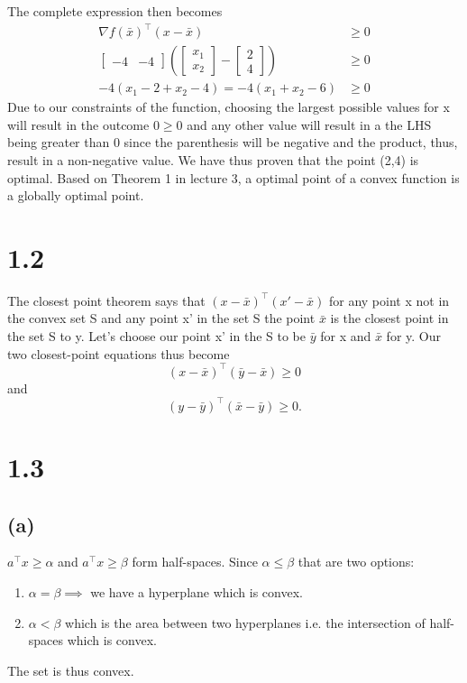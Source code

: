 \documentclass{article}
\begin{document}
	The complete expression then becomes 
	\begin{align}
		\nabla f(\bar{x})^\top (x -\bar{x}) &\geq 0 \\
			\begin{bmatrix}
			-4 &
			-4
		\end{bmatrix}
		\left(\begin{bmatrix}
			x_1 \\ x_2
		\end{bmatrix} -
		\begin{bmatrix}
			2 \\ 4
		\end{bmatrix}\right)
		& \geq 0 \\
		-4(x_1 - 2 + x_2 -4) = -4(x_1 + x_2 -6) & \geq 0
	\end{align}
	Due to our constraints of the function, choosing the largest possible values for x will result in the outcome $0\geq 0$ and any other value will result in a the LHS being greater than 0 since the parenthesis will be negative and the product, thus, result in a non-negative value. We have thus proven that the point (2,4) is optimal. Based on Theorem 1 in lecture 3, a optimal point of a convex function is a globally optimal point.

\section*{1.2}
	The closest point theorem says that $(x-\bar{x})^\top (x'-\bar{x})$ for any point x not in the convex set S and any point x' in the set S the point $\bar{x}$ is the closest point in the set S to y.
	Let's choose our point x' in the S to be $\bar{y}$ for x and $\bar{x}$ for y. Our two closest-point equations thus become
	\begin{equation}
		(x-\bar{x})^\top(\bar{y} - \bar{x}) \geq 0
	\end{equation}
	and
	\begin{equation}
		(y-\bar{y})^\top(\bar{x} - \bar{y}) \geq 0.
	\end{equation}
\section*{1.3}
	\subsection*{(a)}
		$a^\top x \geq \alpha$ and $a^\top x \geq \beta$ form half-spaces. Since $\alpha\leq\beta$ that are two options:
		\begin{enumerate}
			\item $\alpha = \beta \implies $ we have a hyperplane which is convex.
			\item $\alpha < \beta$ which is the area between two hyperplanes i.e. the intersection of half-spaces which is convex.
		\end{enumerate}	
		The set is thus convex.
\end{document}
